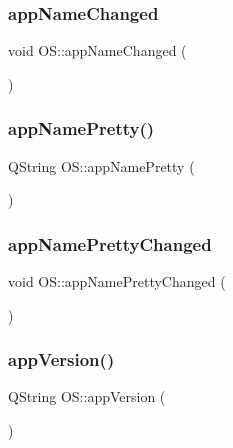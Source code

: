 \subsubsection{\texorpdfstring{app\+Name\+Changed}{appNameChanged}}
{\footnotesize\ttfamily void O\+S\+::app\+Name\+Changed (\begin{DoxyParamCaption}{ }\end{DoxyParamCaption})\hspace{0.3cm}{\ttfamily [signal]}}

\mbox{\label{classOS_af545da4fea44bc32a873f7021498b9fc}} 
\subsubsection{\texorpdfstring{app\+Name\+Pretty()}{appNamePretty()}}
{\footnotesize\ttfamily Q\+String O\+S\+::app\+Name\+Pretty (\begin{DoxyParamCaption}{ }\end{DoxyParamCaption})}

\mbox{\label{classOS_a21d29e6b9eef2bccc62db0d29d56b4c5}} 
\subsubsection{\texorpdfstring{app\+Name\+Pretty\+Changed}{appNamePrettyChanged}}
{\footnotesize\ttfamily void O\+S\+::app\+Name\+Pretty\+Changed (\begin{DoxyParamCaption}{ }\end{DoxyParamCaption})\hspace{0.3cm}{\ttfamily [signal]}}

\mbox{\label{classOS_ad216acfae668255c7e307e965e5e3a50}} 
\subsubsection{\texorpdfstring{app\+Version()}{appVersion()}}
{\footnotesize\ttfamily Q\+String O\+S\+::app\+Version (\begin{DoxyParamCaption}{ }\end{DoxyParamCaption})}

